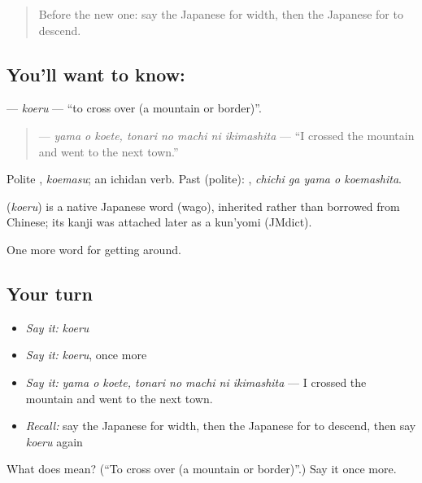 \begin{quote}
Before the new one: say the Japanese for width, then the Japanese for to descend.
\end{quote}

\subsection*{You'll want to know: }
\textbf{} — \emph{koeru} — \textquotedblleft{}to cross over (a mountain or border)\textquotedblright{}.

\begin{quote}
\textbf{   } — \emph{yama o koete, tonari no machi ni ikimashita} — \textquotedblleft{}I crossed the mountain and went to the next town.\textquotedblright{}
\end{quote}

Polite \textbf{}, \emph{koemasu}; an ichidan verb. Past (polite): \textbf{  }, \emph{chichi ga yama o koemashita}.

\begin{cousinweb}
\textbf{} (\emph{koeru}) is a native Japanese word (wago), inherited rather than borrowed from Chinese; its kanji was attached later as a kun'yomi (JMdict).
\end{cousinweb}

\begin{grammarlens}[title={What you've built}]
One more word for getting around.
\end{grammarlens}

\subsection*{Your turn}
\begin{itemize}
\raggedright
  \item \emph{Say it:} \emph{koeru}
  \item \emph{Say it:} \emph{koeru}, once more
  \item \emph{Say it:} \emph{yama o koete, tonari no machi ni ikimashita} — I crossed the mountain and went to the next town.
  \item \emph{Recall:} say the Japanese for width, then the Japanese for to descend, then say \emph{koeru} again
\end{itemize}

\begin{tcolorbox}[breakable,colback=teal!4,colframe=teal!35!black,title={Before you move on}]
What does  mean? (\textquotedblleft{}To cross over (a mountain or border)\textquotedblright{}.) Say it once more.
\end{tcolorbox}
